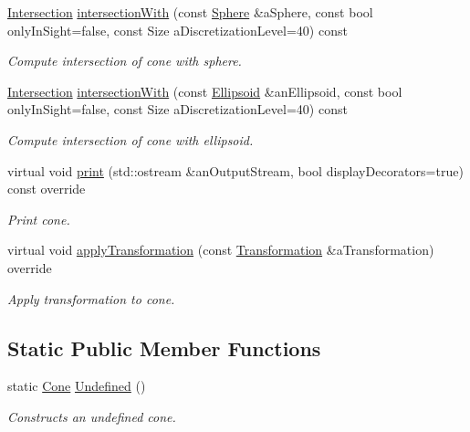 \begin{DoxyCompactItemize}
\hyperlink{classlibrary_1_1math_1_1geom_1_1d3_1_1_intersection}{Intersection} \hyperlink{classlibrary_1_1math_1_1geom_1_1d3_1_1objects_1_1_cone_ab49a0077e48c73a22726ecededf5553a}{intersection\+With} (const \hyperlink{classlibrary_1_1math_1_1geom_1_1d3_1_1objects_1_1_sphere}{Sphere} \&a\+Sphere, const bool only\+In\+Sight=false, const Size a\+Discretization\+Level=40) const
\begin{DoxyCompactList}\small\item\em Compute intersection of cone with sphere. \end{DoxyCompactList}\item 
\hyperlink{classlibrary_1_1math_1_1geom_1_1d3_1_1_intersection}{Intersection} \hyperlink{classlibrary_1_1math_1_1geom_1_1d3_1_1objects_1_1_cone_a2231a2ee1cd5464f04f2126eaee0973f}{intersection\+With} (const \hyperlink{classlibrary_1_1math_1_1geom_1_1d3_1_1objects_1_1_ellipsoid}{Ellipsoid} \&an\+Ellipsoid, const bool only\+In\+Sight=false, const Size a\+Discretization\+Level=40) const
\begin{DoxyCompactList}\small\item\em Compute intersection of cone with ellipsoid. \end{DoxyCompactList}\item 
virtual void \hyperlink{classlibrary_1_1math_1_1geom_1_1d3_1_1objects_1_1_cone_a1da79fa433164204f677bf247ce35538}{print} (std\+::ostream \&an\+Output\+Stream, bool display\+Decorators=true) const override
\begin{DoxyCompactList}\small\item\em Print cone. \end{DoxyCompactList}\item 
virtual void \hyperlink{classlibrary_1_1math_1_1geom_1_1d3_1_1objects_1_1_cone_a838ecaabc29abd32666342a7582a4a3e}{apply\+Transformation} (const \hyperlink{classlibrary_1_1math_1_1geom_1_1d3_1_1_transformation}{Transformation} \&a\+Transformation) override
\begin{DoxyCompactList}\small\item\em Apply transformation to cone. \end{DoxyCompactList}\end{DoxyCompactItemize}
\subsection*{Static Public Member Functions}
\begin{DoxyCompactItemize}
\item 
static \hyperlink{classlibrary_1_1math_1_1geom_1_1d3_1_1objects_1_1_cone}{Cone} \hyperlink{classlibrary_1_1math_1_1geom_1_1d3_1_1objects_1_1_cone_add91d1f26389385cca599be25cb18716}{Undefined} ()
\begin{DoxyCompactList}\small\item\em Constructs an undefined cone. \end{DoxyCompactList}\end{DoxyCompactItemize}


